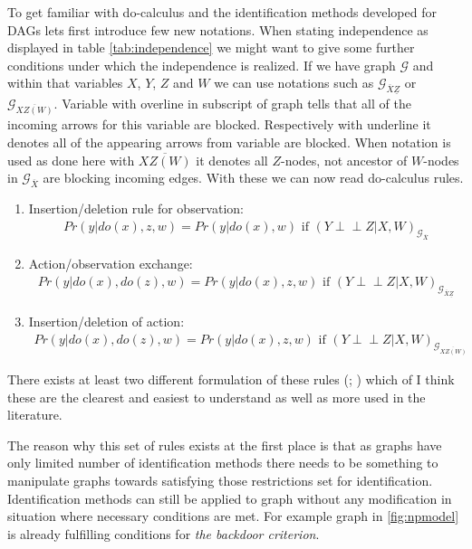 \documentclass[main=english,12pt,a4paper,pdftex,econ,utf8]{aaltothesis}
\newcommand{\indep}{\perp \!\!\! \perp}
\newcommand{\g}{\mathcal{G}}
\begin{document}
To get familiar with do-calculus and the identification methods developed for DAGs lets first introduce few new notations. When stating independence as displayed in table \ref{tab:independence} we might want to give some further conditions under which the independence is realized. If we have graph $\g$ and within that variables $X$, $Y$, $Z$ and $W$ we can use notations such as $\g_{\overline{X}\underline{Z}}$ or $\g_{\overline{XZ(W)}}$. Variable with overline in subscript of graph tells that all of the incoming arrows for this variable are blocked. Respectively with underline it denotes all of the appearing arrows from variable are blocked. When notation is used as done here with $\overline{XZ(W)}$ it denotes all $Z$-nodes, not ancestor of $W$-nodes in $\g_{\overline{X}}$ are blocking incoming edges. With these we can now read do-calculus rules.

\begin{enumerate}
    \item Insertion/deletion rule for observation:
        \begin{gather} \label{eq:do1}
            Pr(y|do(x),z,w)=Pr(y|do(x),w)\text{ if }(Y\indep Z|X,W)_{\g_{\overline{X}}}
        \end{gather}
    \item Action/observation exchange:
        \begin{gather} \label{eq:do2}
            Pr(y|do(x), do(z), w)=Pr(y|do(x),z,w)\text{ if }(Y\indep Z|X,W)_{\g_{\overline{X}\underline{Z}}}
        \end{gather}
    \item Insertion/deletion of action:
        \begin{gather} \label{eq:do3}
            Pr(y|do(x),do(z),w)=Pr(y|do(x),z,w)\text{ if }(Y\indep Z|X,W)_{\g_{\overline{XZ(W)}}}
        \end{gather}
    \label{list:do}
\end{enumerate}

\noindent There exists at least two different formulation of these rules (\cite{Jud1995}; \cite{Pearl2009a}) which of I think these are the clearest and easiest to understand as well as more used in the literature.

The reason why this set of rules exists at the first place is that as graphs have only limited number of identification methods there needs to be something to manipulate graphs towards satisfying those restrictions set for identification. Identification methods can still be applied to graph without any modification in situation where necessary conditions are met. For example graph in \ref{fig:npmodel} is already fulfilling conditions for \textit{the backdoor criterion}.
\end{document}
